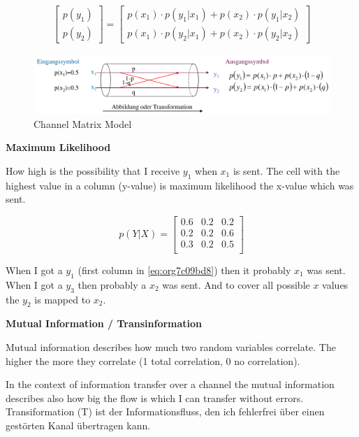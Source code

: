 \documentclass[11pt,twoside,twocolumn,landscape]{article}
\begin{document}
\begin{align}
  \begin{bmatrix}
    p(y_1) \\
    p(y_2)
  \end{bmatrix}
  = 
  \begin{bmatrix}
    p(x_1) \cdot p(y_1 | x_1) + p(x_2) \cdot p(y_1|x_2) \\
    p(x_1) \cdot p(y_2 | x_1) + p(x_2) \cdot p(y_2|x_2)
  \end{bmatrix}
\end{align}

\begin{figure}[htbp]
\centering
\includegraphics[width=.9\linewidth]{img/kanalmatrix_modell.png}
\caption{\label{fig:org19bf965}Channel Matrix Model}
\end{figure}

\textbf{Maximum Likelihood}

How high is the possibility that I receive \(y_1\) when \(x_1\) is sent.
The cell with the highest value in a column (y-value) is maximum likelihood the x-value which was sent.

\begin{equation}
\label{eq:org7c09bd8}
  p(Y|X) =
  \begin{bmatrix}
    0.6 & 0.2 & 0.2 \\
    0.2 & 0.2 & 0.6 \\
    0.3 & 0.2 & 0.5 \\
  \end{bmatrix}
\end{equation}

When I got a \(y_1\) (first column in \ref{eq:org7c09bd8}) then it probably \(x_1\) was sent.
When I got a \(y_3\) then probably a \(x_2\) was sent.
And to cover all possible \(x\) values the \(y_2\) is mapped to \(x_2\).

\textbf{Mutual Information / Transinformation}

Mutual information describes how much two random variables correlate.
The higher the more they correlate (1 total correlation, 0 no correlation).

In the context of information transfer over a channel the mutual information describes also how big the flow is which I can transfer without errors.
Transiformation (T) ist der Informationsfluss, den ich fehlerfrei über einen gestörten Kanal übertragen kann.
\end{document}
